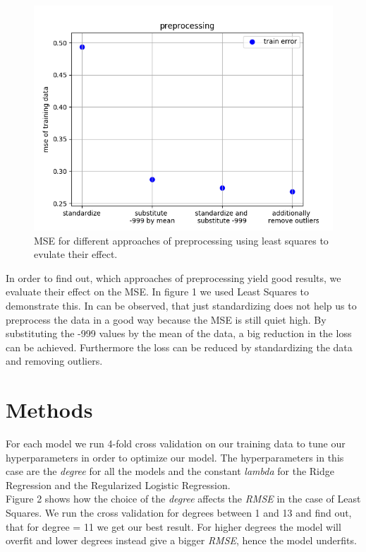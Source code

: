 \documentclass[10pt,conference,compsocconf]{IEEEtran}
\begin{document}
\begin{figure}[htbp]
	\centering
	\includegraphics[width=\columnwidth]{preprocessing.png}
	\caption{MSE for different approaches of preprocessing using least squares to evulate their effect.}
	\vspace{-3mm}
	\label{fig:prepro}
\end{figure}


In order to find out, which approaches of preprocessing yield good results, we evaluate their effect on the MSE. In figure 1 we used Least Squares to demonstrate this. In can be observed, that just standardizing does not help us to preprocess the data in a good way because the MSE is still quiet high. 
By substituting the -999 values by the mean of the data, a big reduction in the loss can be achieved. Furthermore the loss can be reduced by standardizing the data and removing outliers. \\



\section{Methods}
\label{sec:tips-writing}


For each model we run 4-fold cross validation on our training data to tune our hyperparameters in order to optimize our model. The hyperparameters in this case are the \textit{degree} for all the models and the constant \textit{lambda} for the Ridge Regression and the Regularized Logistic Regression.
\\
Figure 2 shows how the choice of the \textit{degree} affects the \textit{RMSE} in the case of Least Squares. We run the cross validation for degrees between 1 and 13 and find out, that for degree = 11 we get our best result. For higher degrees the model will overfit and lower degrees instead give a bigger \textit{RMSE}, hence the model underfits.
\end{document}
